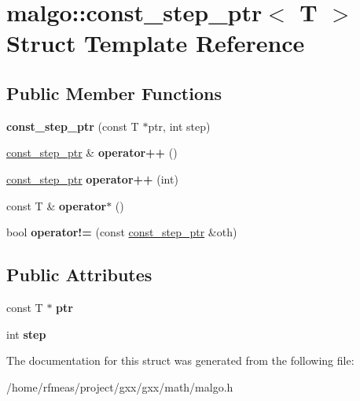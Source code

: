\hypertarget{structmalgo_1_1const__step__ptr}{}\section{malgo\+:\+:const\+\_\+step\+\_\+ptr$<$ T $>$ Struct Template Reference}
\label{structmalgo_1_1const__step__ptr}
\subsection*{Public Member Functions}
\begin{DoxyCompactItemize}
\item 
{\bfseries const\+\_\+step\+\_\+ptr} (const T $\ast$ptr, int step)\hypertarget{structmalgo_1_1const__step__ptr_a23e46253b0b02bb6fdcc6b217a67bff3}{}\label{structmalgo_1_1const__step__ptr_a23e46253b0b02bb6fdcc6b217a67bff3}

\item 
\hyperlink{structmalgo_1_1const__step__ptr}{const\+\_\+step\+\_\+ptr} \& {\bfseries operator++} ()\hypertarget{structmalgo_1_1const__step__ptr_a908655e3fc12b234a602e3685b73bca2}{}\label{structmalgo_1_1const__step__ptr_a908655e3fc12b234a602e3685b73bca2}

\item 
\hyperlink{structmalgo_1_1const__step__ptr}{const\+\_\+step\+\_\+ptr} {\bfseries operator++} (int)\hypertarget{structmalgo_1_1const__step__ptr_ae953f93da99ce9b85cbe548780ac9756}{}\label{structmalgo_1_1const__step__ptr_ae953f93da99ce9b85cbe548780ac9756}

\item 
const T \& {\bfseries operator$\ast$} ()\hypertarget{structmalgo_1_1const__step__ptr_a0aab3db1cbe52957a2cc270ac4d56268}{}\label{structmalgo_1_1const__step__ptr_a0aab3db1cbe52957a2cc270ac4d56268}

\item 
bool {\bfseries operator!=} (const \hyperlink{structmalgo_1_1const__step__ptr}{const\+\_\+step\+\_\+ptr} \&oth)\hypertarget{structmalgo_1_1const__step__ptr_ad0440de775e28d4ba0200eae455ce0f0}{}\label{structmalgo_1_1const__step__ptr_ad0440de775e28d4ba0200eae455ce0f0}

\end{DoxyCompactItemize}
\subsection*{Public Attributes}
\begin{DoxyCompactItemize}
\item 
const T $\ast$ {\bfseries ptr}\hypertarget{structmalgo_1_1const__step__ptr_ac93b86fa0c874d4ce33cff5059a3e325}{}\label{structmalgo_1_1const__step__ptr_ac93b86fa0c874d4ce33cff5059a3e325}

\item 
int {\bfseries step}\hypertarget{structmalgo_1_1const__step__ptr_afe0a9a2d33b3cf91c522c7ea73729f17}{}\label{structmalgo_1_1const__step__ptr_afe0a9a2d33b3cf91c522c7ea73729f17}

\end{DoxyCompactItemize}


The documentation for this struct was generated from the following file\+:\begin{DoxyCompactItemize}
\item 
/home/rfmeas/project/gxx/gxx/math/malgo.\+h\end{DoxyCompactItemize}
